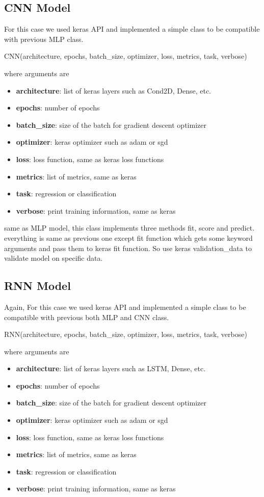 \documentclass[10pt]{SelfArx} %
\begin{document}
\subsection{CNN Model}
For this case we used keras API and implemented a simple class to be compatible with previous MLP class.
\begin{python}
CNN(architecture, epochs,
   batch_size, optimizer, loss,
   metrics, task, verbose)
\end{python}
where arguments are
\begin{itemize}
\item 	\textbf{architecture}: list of keras layers such as Cond2D, Dense, etc.
\item  \textbf{epochs}: number of epochs
\item  \textbf{batch\_size}: size of the batch for gradient descent optimizer
\item  \textbf{optimizer}: keras optimizer such as adam or sgd
\item  \textbf{loss}: loss function, same as keras loss functions
\item \textbf{metrics}: list of metrics, same as keras
\item  \textbf{task}: regression or classification
\item  \textbf{verbose}: print training information, same as keras
\end{itemize}

same as MLP model, this class implements three methods fit, score and predict. everything is same as previous one except fit function which gets some keyword arguments and pass them to keras fit function. So use keras validation\_data to validate model on specific data.

\subsection{RNN Model}
Again, For this case we used keras API and implemented a simple class to be compatible with previous both MLP and CNN class.
\begin{python}
	RNN(architecture, epochs,
	batch_size, optimizer, loss,
	metrics, task, verbose)
\end{python}
where arguments are
\begin{itemize}
	\item 	\textbf{architecture}: list of keras layers such as LSTM, Dense, etc.
	\item  \textbf{epochs}: number of epochs
	\item  \textbf{batch\_size}: size of the batch for gradient descent optimizer
	\item  \textbf{optimizer}: keras optimizer such as adam or sgd
	\item  \textbf{loss}: loss function, same as keras loss functions
	\item \textbf{metrics}: list of metrics, same as keras
	\item  \textbf{task}: regression or classification
	\item  \textbf{verbose}: print training information, same as keras
\end{itemize}
\end{document}
